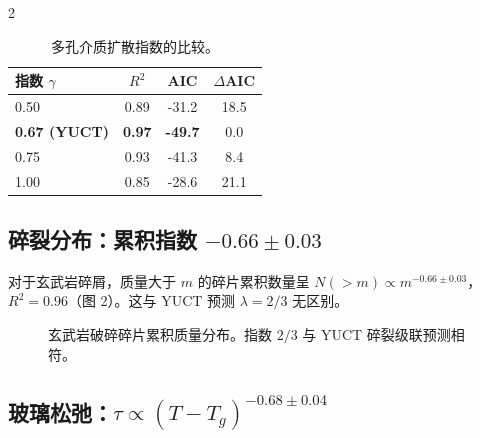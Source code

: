 \documentclass[11pt,a4paper]{article}
\begin{document}
\begin{multicols}{2}
		\begin{table}[htbp]
			\centering
			\caption{多孔介质扩散指数的比较。}
			\label{tab:diffusion}
			\begin{tabular}{lccc}
				\toprule
				指数 $\gamma$ & $R^2$ & AIC & $\Delta$AIC \\
				\midrule
				0.50 & 0.89 & -31.2 & 18.5 \\
				\textbf{0.67 (YUCT)} & \textbf{0.97} & \textbf{-49.7} & 0.0 \\
				0.75 & 0.93 & -41.3 & 8.4 \\
				1.00 & 0.85 & -28.6 & 21.1 \\
				\bottomrule
			\end{tabular}
		\end{table}
		
		\subsection{碎裂分布：累积指数 \(-0.66 \pm 0.03\)}
		
		对于玄武岩碎屑，质量大于 \(m\) 的碎片累积数量呈 \(N(>m) \propto m^{-0.66 \pm 0.03}\)，\(R^2 = 0.96\)（图 2）。这与 YUCT 预测 \(\lambda = 2/3\) 无区别。
		
		\begin{figure}[htbp]
			\centering
			\caption{玄武岩破碎碎片累积质量分布。指数 \(2/3\) 与 YUCT 碎裂级联预测相符。}
			\label{fig:fragmentation}
		\end{figure}
		
		\subsection{玻璃松弛：\(\tau \propto (T - T_g)^{-0.68 \pm 0.04}\)}
		

\end{multicols}
\end{document}
